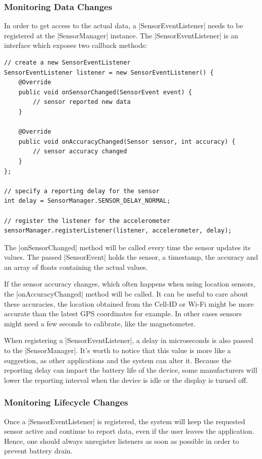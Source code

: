 \subsubsection{Monitoring Data Changes}
\label{sec:implementation:monitoringdatachanges}
In order to get access to the actual data, a |SensorEventListener|\cite{androiddocs:sensoreventlistener} needs to be registered at the |SensorManager| instance. The |SensorEventListener| is an interface which exposes two callback methods:

\begin{lstlisting}[label=registersensoreventlistener]
// create a new SensorEventListener
SensorEventListener listener = new SensorEventListener() {
	@Override
	public void onSensorChanged(SensorEvent event) {
		// sensor reported new data
	}

	@Override
	public void onAccuracyChanged(Sensor sensor, int accuracy) {
		// sensor accuracy changed
	}
};

// specify a reporting delay for the sensor
int delay = SensorManager.SENSOR_DELAY_NORMAL;

// register the listener for the accelerometer
sensorManager.registerListener(listener, accelerometer, delay);
\end{lstlisting}

The |onSensorChanged| method will be called every time the sensor updates its values. The passed |SensorEvent|\cite{androiddocs:sensorevent} holds the sensor, a timestamp, the accuracy and an array of floats containing the actual values.

If the sensor accuracy changes, which often happens when using location sensors, the |onAccuracyChanged| method will be called.
It can be useful to care about these accuracies, the location obtained from the Cell-ID or Wi-Fi might be more accurate than the latest GPS coordinates for example.
In other cases sensors might need a few seconds to calibrate, like the magnetometer.

When registering a |SensorEventListener|, a delay in microseconds is also passed to the |SensorManager|.
It's worth to notice that this value is more like a suggestion, as other applications and the system can alter it.
Because the reporting delay can impact the battery life of the device, some manufacturers will lower the reporting interval when the device is idle or the display is turned off.

\subsubsection{Monitoring Lifecycle Changes}
\label{sec:implementation:monitoringlifecyclechanges}
Once a |SensorEventListener| is registered, the system will keep the requested sensor active and continue to report data, even if the user leaves the application.
Hence, one should always unregister listeners as soon as possible in order to prevent battery drain.

